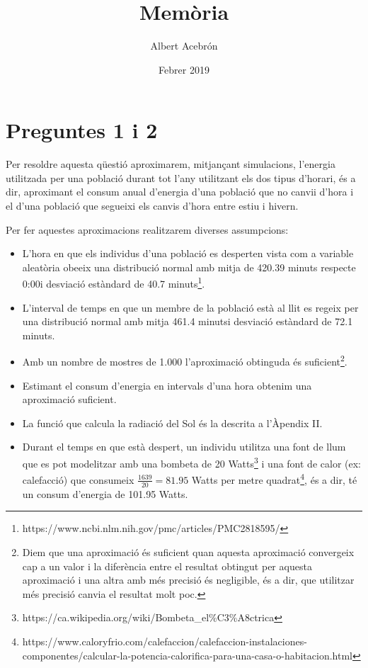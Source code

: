 \documentclass{article}
\title{Memòria}
\author{Albert Acebrón}
\date{Febrer 2019}
\begin{document}
\maketitle

\section*{Preguntes 1 i 2}


Per resoldre aquesta qüestió aproximarem, mitjançant simulacions, l’energia utilitzada per una població durant tot l’any utilitzant els dos tipus d’horari, és a dir, aproximant el consum anual d’energia d’una població que no canvii d’hora i el d’una població que segueixi els canvis d’hora entre estiu i hivern.

Per fer aquestes aproximacions realitzarem diverses assumpcions:
\begin{itemize}
    \item L’hora en que els individus d’una població es desperten vista com a variable aleatòria obeeix una distribució normal amb mitja de 420.39 minuts respecte 0:00\footnotemark[\ref{sleepstats}] i desviació estàndard de 40.7 minuts\footnote{\label{sleepstats}https://www.ncbi.nlm.nih.gov/pmc/articles/PMC2818595/}.
    \item L’interval de temps en que un membre de la població està al llit es regeix per una distribució normal amb mitja 461.4 minuts\footnotemark[\ref{sleepstats}] i desviació estàndard de 72.1 minuts\footnotemark[\ref{sleepstats}].
    \item Amb un nombre de mostres de 1.000 l’aproximació obtinguda és suficient\footnote{\label{aproxSuficient}Diem que una aproximació és suficient quan aquesta aproximació convergeix cap a un valor i la diferència entre el resultat obtingut per aquesta aproximació i una altra amb més precisió és negligible, és a dir, que utilitzar més precisió canvia el resultat molt poc.}.
    \item Estimant el consum d’energia en intervals d’una hora obtenim una aproximació suficient\footnotemark[\ref{aproxSuficient}].
    \item La funció que calcula la radiació del Sol és la descrita a l'Àpendix II.
    \item Durant el temps en que està despert, un individu utilitza una font de llum que es pot modelitzar amb una bombeta de 20 Watts\footnote{https://ca.wikipedia.org/wiki/Bombeta\_el\%C3\%A8ctrica} i una font de calor (ex: calefacció) que consumeix $\frac{1639}{20}=81.95$ Watts per metre quadrat\footnote{https://www.caloryfrio.com/calefaccion/calefaccion-instalaciones-componentes/calcular-la-potencia-calorifica-para-una-casa-o-habitacion.html}, és a dir, té un consum d'energia de 101.95 Watts.
\end{itemize}
\end{document}
